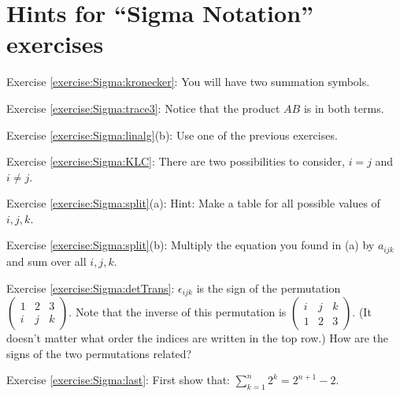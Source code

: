 \section{Hints for ``Sigma Notation'' exercises}\label{sec:sigma:hints} 


\noindent Exercise \ref{exercise:Sigma:kronecker}:  You will have two summation symbols.

\noindent Exercise \ref{exercise:Sigma:trace3}: Notice that the product ${AB}$ is in both terms.

\noindent Exercise \ref{exercise:Sigma:linalg}(b): Use one of the previous exercises.

\noindent Exercise \ref{exercise:Sigma:KLC}: There are two possibilities to consider, $i=j$ and $i \neq j$.

\noindent Exercise \ref{exercise:Sigma:split}(a): Hint: Make a table for all possible values of $i,j,k$.

\noindent Exercise \ref{exercise:Sigma:split}(b): Multiply the equation you found in (a) by $a_{ijk}$ and sum over all $i,j,k$.

\noindent Exercise \ref{exercise:Sigma:detTrans}: $\epsilon_{ijk}$ is the sign of the permutation $\left( \begin{smallmatrix}  1 & 2 & 3  \\ i & j & k  \end{smallmatrix} \right)$. Note that the inverse of this permutation is $ \left( \begin{smallmatrix}  i & j & k  \\ 1 & 2 & 3  \end{smallmatrix} \right)$.  (It doesn't matter what order the indices are written in the top row.) How are the signs of the two permutations related? 


\noindent Exercise \ref{exercise:Sigma:last}: First show that:  $\sum_{k=1}^n 2^k = 2^{n+1} - 2$.
